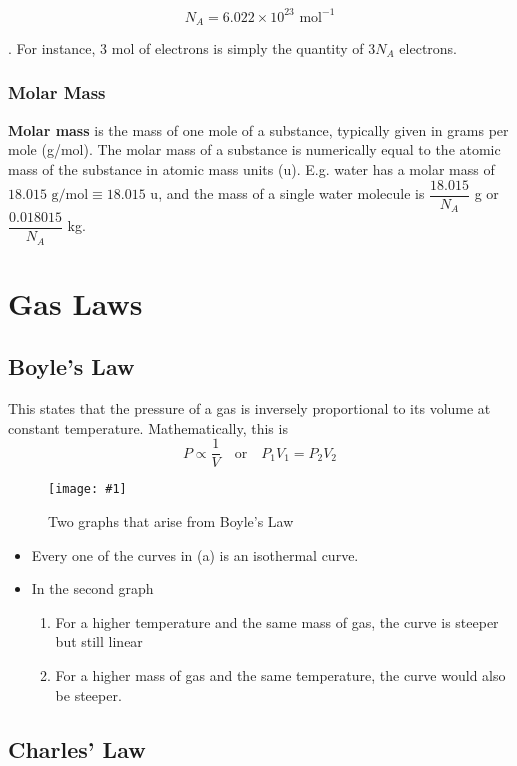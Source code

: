 \documentclass[a4paper,12pt]{article}
\let\oldsection\section
\renewcommand\section{\clearpage\oldsection}
\newcommand{\eqor}{\quad \text{or} \quad}
\newcommand{\img}[4]{\begin{center}
  \begin{figure}[H]
    \centering
    \texttt{[image: \#1]}
    \caption{#3}
    \label{fig:#4}
  \end{figure}
\end{center}}
\begin{document}
$$N_A = 6.022 \times 10^{23} \text{ mol}^{-1}$$

. For instance, 3 mol of electrons is simply the quantity of $3N_A$ electrons.


\subsubsection{Molar Mass}

\textbf{Molar mass} is the mass of one mole of a substance, typically given in grams per mole (g/mol). The molar mass of a substance is numerically equal to the atomic mass of the substance in atomic mass units (u). E.g. water has a molar mass of $18.015 \text{ g/mol} \equiv 18.015 \text{ u}$, and the mass of a single water molecule is $\dfrac{18.015}{N_A}$ g or $\dfrac{0.018015}{N_A}$ kg.

\section{Gas Laws}

\subsection{Boyle's Law}

This states that the pressure of a gas is inversely proportional to its volume at constant temperature. Mathematically, this is
$$P \propto \frac{1}{V} \eqor P_1V_1 = P_2V_2$$

\img{boyle.png}{0.9}{Two graphs that arise from Boyle's Law}{boyle}
\begin{itemize}
  \item Every one of the curves in (a) is an isothermal curve.
  \item In the second graph
        \begin{enumerate}
          \item For a higher temperature and the same mass of gas, the curve is steeper but still linear
          \item For a higher mass of gas and the same temperature, the curve would also be steeper.
        \end{enumerate}
\end{itemize}

\subsection{Charles' Law}
\end{document}
